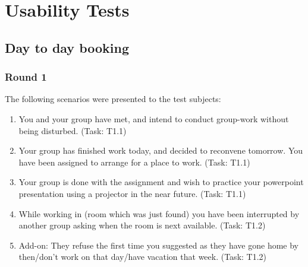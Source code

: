 \pagebreak
\section{Usability Tests}
\label{app:tests}
\subsection{Day to day booking}
\subsubsection{Round 1}
The following scenarios were presented to the test subjects:
\begin{enumerate}
\item You and your group have met, and intend to conduct group-work without being disturbed. (Task: T1.1)
\item Your group has finished work today, and decided to reconvene tomorrow. You have been assigned to arrange for a place to work. (Task: T1.1)
\item Your group is done with the assignment and wish to practice your powerpoint presentation using a projector in the near future. (Task: T1.1)
\item While working in (room which was just found) you have been interrupted by another group asking when the room is next available. (Task: T1.2)
\item Add-on: They refuse the first time you suggested as they have gone home by then/don't work on that day/have vacation that week. (Task: T1.2)
\end{enumerate}

